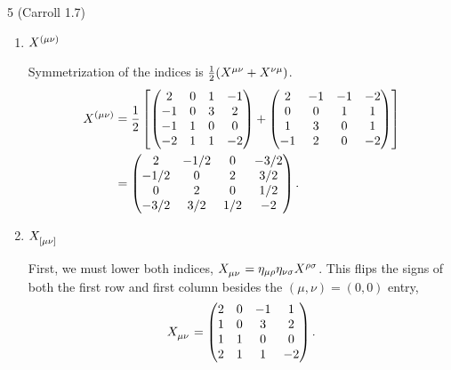 \documentclass[11pt]{article}
\begin{document}
\begin{problem}{5 (Carroll 1.7)}
\begin{enumerate}[label=(\alph*)]
\begin{answer}
\begin{equation}
		      \end{equation}
		      \end{answer}
		\item \( \tensor{X}{^{(\mu\nu)}_{}} \)
\begin{answer}
		      Symmetrization of the indices is \( \frac{1}{2}(\tensor{X}{^{\mu\nu}} + \tensor{X}{^{\nu\mu}}) \).
		      \begin{equation}
            \begin{aligned}
		      \tensor{X}{^{(\mu\nu)}} &= \frac{1}{2} \left[ \begin{pmatrix}
			2  & 0 & 1 & -1 \\
			-1 & 0 & 3 & 2  \\
			-1 & 1 & 0 & 0  \\
			-2 & 1 & 1 & -2
		      \end{pmatrix} +
		      \begin{pmatrix}
			2  & -1 & -1 & -2 \\
			0 & 0 & 1 & 1  \\
			1 & 3 & 0 & 1  \\
			-1 & 2 & 0 & -2
		      \end{pmatrix} \right] \\ &=
		      \begin{pmatrix}
		          2 & -1/2 & 0 & -3/2 \\
		          -1/2 & 0 & 2 & 3/2 \\
		          0 & 2 & 0 & 1/2 \\
		          -3/2 & 3/2 & 1/2 & -2
		      \end{pmatrix}.
              \end{aligned}
		      \end{equation}
		      \end{answer}
		\item \( \tensor{X}{^{}_{[\mu\nu]}} \)
\begin{answer}
		      First, we must lower both indices, \( \tensor{X}{_{\mu\nu}} = \eta_{\mu\rho}\eta_{\nu\sigma}\tensor{X}{^{\rho\sigma}} \). This flips the signs of both the first row and first column besides the \( (\mu,\nu) = (0,0) \) entry,
		      \begin{equation}
		      \tensor{X}{_{\mu\nu}} = \begin{pmatrix}
		          2 & 0 & -1 & 1 \\
		          1 & 0 & 3 & 2 \\
		          1 & 1 & 0 & 0 \\
		          2 & 1 & 1 & -2
		      \end{pmatrix}.

\end{equation}
\end{answer}
\end{enumerate}
\end{problem}
\end{document}
